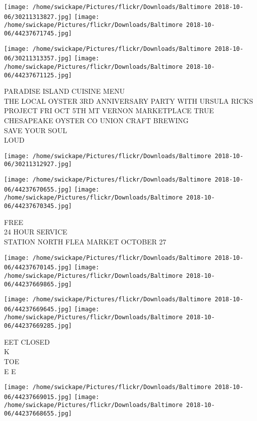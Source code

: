\documentclass[10pt,letterpaper]{article}
\begin{document}
\texttt{[image: /home/swickape/Pictures/flickr/Downloads/Baltimore 2018-10-06/30211313827.jpg]}
\texttt{[image: /home/swickape/Pictures/flickr/Downloads/Baltimore 2018-10-06/44237671745.jpg]}

\texttt{[image: /home/swickape/Pictures/flickr/Downloads/Baltimore 2018-10-06/30211313357.jpg]}
\texttt{[image: /home/swickape/Pictures/flickr/Downloads/Baltimore 2018-10-06/44237671125.jpg]}

PARADISE ISLAND CUISINE MENU\\
THE LOCAL OYSTER 3RD ANNIVERSARY PARTY WITH URSULA RICKS PROJECT FRI OCT 5TH MT VERNON MARKETPLACE TRUE CHESAPEAKE OYSTER CO UNION CRAFT BREWING\\
SAVE YOUR SOUL\\
LOUD\\
\pagebreak

\texttt{[image: /home/swickape/Pictures/flickr/Downloads/Baltimore 2018-10-06/30211312927.jpg]}

\vspace{0.25in}
\texttt{[image: /home/swickape/Pictures/flickr/Downloads/Baltimore 2018-10-06/44237670655.jpg]}
\texttt{[image: /home/swickape/Pictures/flickr/Downloads/Baltimore 2018-10-06/44237670345.jpg]}

FREE\\
24 HOUR SERVICE\\
STATION NORTH FLEA MARKET OCTOBER 27\\
\pagebreak

\texttt{[image: /home/swickape/Pictures/flickr/Downloads/Baltimore 2018-10-06/44237670145.jpg]}
\texttt{[image: /home/swickape/Pictures/flickr/Downloads/Baltimore 2018-10-06/44237669865.jpg]}

\texttt{[image: /home/swickape/Pictures/flickr/Downloads/Baltimore 2018-10-06/44237669645.jpg]}
\texttt{[image: /home/swickape/Pictures/flickr/Downloads/Baltimore 2018-10-06/44237669285.jpg]}

EET CLOSED\\
K\\
TOE\\
E E\\
\pagebreak

\texttt{[image: /home/swickape/Pictures/flickr/Downloads/Baltimore 2018-10-06/44237669015.jpg]}
\texttt{[image: /home/swickape/Pictures/flickr/Downloads/Baltimore 2018-10-06/44237668655.jpg]}
\end{document}

